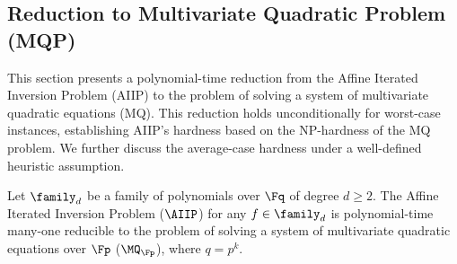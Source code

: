 \subsection{Reduction to Multivariate Quadratic Problem (MQP)}\label{subsec:mq-reduction}
            This section presents a polynomial-time reduction from the Affine Iterated Inversion Problem (AIIP) to the problem of solving a system of multivariate quadratic equations (MQ). This reduction holds unconditionally for worst-case instances, establishing AIIP's hardness based on the NP-hardness of the MQ problem. We further discuss the average-case hardness under a well-defined heuristic assumption.
            \begin{theorem}\label{thm:aiip-mq-worstcase}
                Let $\family_d$ be a family of polynomials over $\Fq$ of degree $d \geq 2$. The Affine Iterated Inversion Problem ($\AIIP$) for any $f \in \family_d$ is polynomial-time many-one reducible to the problem of solving a system of multivariate quadratic equations over $\Fp$ ($\MQ_{\Fp}$), where $q = p^k$.
            \end{theorem}
